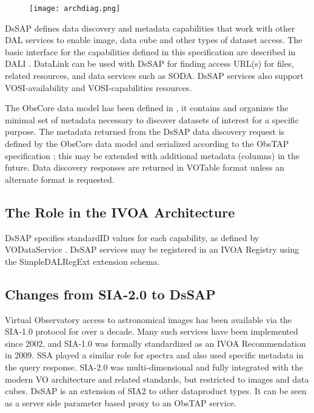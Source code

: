 \documentclass[11pt,a4paper]{ivoa}
\begin{document}
\begin{figure}[H]
\centering

\texttt{[image: archdiag.png]}
\label{fig:architecture}
\end{figure}

DsSAP defines data discovery and metadata capabilities that work with other DAL services to enable image, data cube and other types of dataset access. The basic interface for the capabilities defined in this specification are described in DALI \citep{std:DALI}. DataLink can be used with DsSAP for finding access URL(s) for files, related resources, and data services such as SODA. DsSAP services also support VOSI-availability and VOSI-capabilities \citep{std:VOSI}  resources.

The ObsCore data model has been defined in \cite{std:OBSCORE}, it contains and organizes the minimal set of metadata necessary to discover datasets of interest for a specific purpose. The metadata returned from the DsSAP data discovery request is defined by the ObsCore data model and serialized according to the ObsTAP specification \citep{std:OBSCORE}; this may be extended with additional metadata (columns)  in the future. Data discovery responses are returned in VOTable \citep{std:VOTABLE} format unless an alternate format is requested.

\subsection{The Role in the IVOA Architecture}

DsSAP specifies standardID values for each capability, as defined by VODataService \citep{std:VODS11}. DsSAP services may be registered in an IVOA Registry using the SimpleDALRegExt \citep{std:DALREGEXT} extension schema.
\subsection{Changes from SIA-2.0 to DsSAP}

Virtual Observatory access to astronomical images has been available via the SIA-1.0 protocol for over a decade.  
Many such services have been implemented since 2002, and SIA-1.0 \citep{std:SIAP} was formally standardized as an IVOA Recommendation in 2009. 
SSA \citep{std:SSAP} played a similar role for spectra and also used specific metadata in the query response. 
SIA-2.0 \citep{std:SIAv2} was multi-dimensional and fully integrated with the modern VO architecture and related 
standards, but restricted to images and data cubes.
DsSAP is an extension of SIA2 to other dataproduct types. It can be seen as a server side  parameter based proxy to an ObsTAP service.
\end{document}
